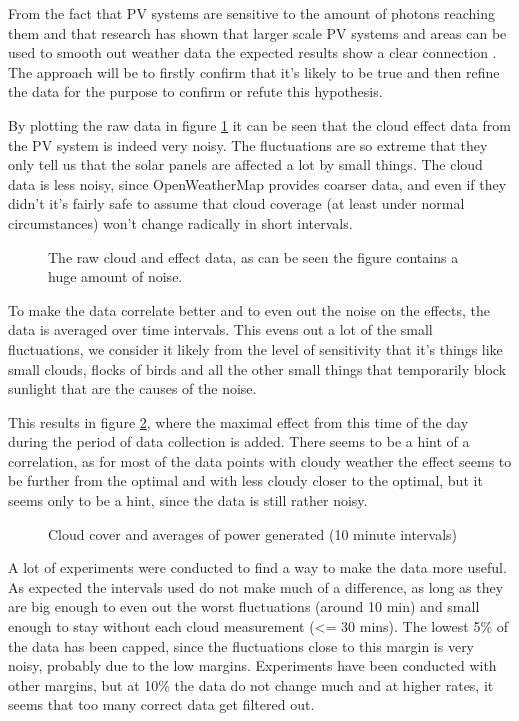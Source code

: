 From the fact that PV systems are sensitive to the amount of photons
reaching them and that research has shown that larger scale PV systems
and areas can be used to smooth out weather data the expected results
show a clear connection \citep{southafrica, cloudTrack, photovoltaic}.
The approach will be to firstly confirm that it's likely to be true
and then refine the data for the purpose to confirm or refute this
hypothesis.

By plotting the raw data in figure \ref{fig:noise} it can be seen that
the cloud effect data from the PV system is indeed very noisy.  The
fluctuations are so extreme that they only tell us that the solar
panels are affected a lot by small things.  The cloud data is less
noisy, since OpenWeatherMap provides coarser data, and even if they
didn't it's fairly safe to assume that cloud coverage (at least under
normal circumstances) won't change radically in short intervals.

\begin{figure}
  \centering
  \tiny
  
  \caption{The raw cloud and effect data, as can be seen the figure
    contains a huge amount of noise.}
  \label{fig:noise}
\end{figure}

To make the data correlate better and to even out the noise on the
effects, the data is averaged over time intervals.  This evens out a
lot of the small fluctuations, we consider it likely from the level of
sensitivity that it's things like small clouds, flocks of birds and
all the other small things that temporarily block sunlight that are
the causes of the noise.

This results in figure \ref{fig:cloudsAndPower}, where the maximal
effect from this time of the day during the period of data collection
is added.  There seems to be a hint of a correlation, as for most of
the data points with cloudy weather the effect seems to be further
from the optimal and with less cloudy closer to the optimal, but it
seems only to be a hint, since the data is still rather noisy.

\begin{figure}
  \centering
    \tiny
    
  \caption{Cloud cover and averages of power generated (10 minute
    intervals)}
  \label{fig:cloudsAndPower}
\end{figure}

A lot of experiments were conducted to find a way to make the data
more useful.  As expected the intervals used do not make much of a
difference, as long as they are big enough to even out the worst
fluctuations (around 10 min) and small enough to stay without each
cloud measurement (<= 30 mins).  The lowest 5\% of the data has been
capped, since the fluctuations close to this margin is very noisy,
probably due to the low margins. Experiments have been conducted with
other margins, but at 10\% the data do not change much and at higher
rates, it seems that too many correct data get filtered out.

